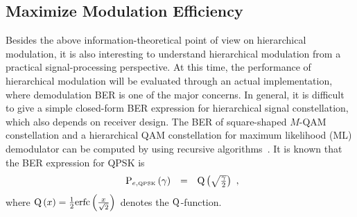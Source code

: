 \documentclass[conference]{IEEEtran}
\begin{document}
\subsection{Maximize Modulation Efficiency}
Besides the above information-theoretical point of view on
hierarchical modulation, it is also interesting to understand
hierarchical modulation from a practical signal-processing
perspective. At this time, the performance of hierarchical
modulation will be evaluated through an actual implementation,
where demodulation BER is one of the major concerns. In general,
it is difficult to give a simple closed-form BER expression for
hierarchical signal constellation, which also depends on receiver
design. The BER of square-shaped $M$-QAM constellation and a
hierarchical QAM constellation for maximum likelihood (ML)
demodulator can be computed by using recursive
algorithms~\cite{Vitt03}. It is known that the BER expression for
QPSK is
\begin{equation}
\begin{array}{rcl}
{\rm P}_{e,\mbox{\tiny QPSK}}\left(\gamma\right)&=&{\rm
Q}\left(\sqrt{\frac{\gamma}{2}}\right)
\end{array},\label{BER_QPSK}
\end{equation}
\noindent where ${\rm Q}\left(x\right)=\frac{1}{2}{\rm
erfc}\left(\frac{x}{\sqrt{2}}\right)$ denotes the $\rm
Q$-function.
\begin{figure} 
\end{figure}
\end{document}
